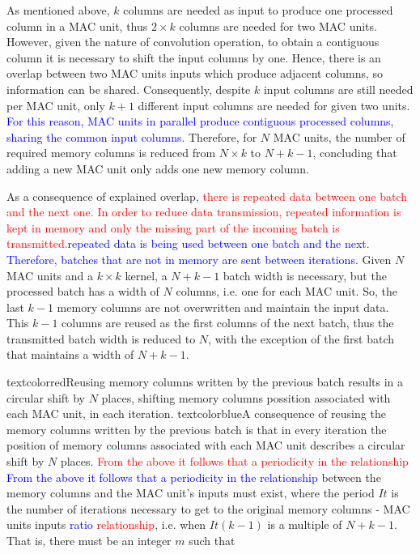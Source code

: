 \documentclass[conference,compsoc]{IEEEtran}
\begin{document}
As mentioned above, $k$ columns are needed as input to produce one processed
column in a MAC unit, thus $2 \times k$ columns are needed for two MAC units.
However, given the nature of convolution operation, to obtain a contiguous
column it is necessary to shift the input columns by one. Hence, there is an
overlap between two MAC units inputs which produce adjacent columns, so information can
be shared.
Consequently, despite $k$ input columns are still needed per MAC unit, only $k+1$
different input columns are needed for given two units. 
\textcolor{blue}{For this reason, MAC units in parallel produce contiguous processed
columns, sharing the common input columns}. 
Therefore, for $N$ MAC units, the number of required memory columns is reduced from $N \times k$ to $N+k-1$, concluding
that adding a new MAC unit only adds one new memory column.

As a consequence of explained overlap, \textcolor{red}{there is repeated data
between one batch and the next one. In order to reduce data transmission, repeated
information is kept in memory and only the missing part of 
the incoming batch is transmitted.}\textcolor{blue}{repeated data is being used
between one batch and the next. Therefore, batches that are not in memory are
sent between iterations.} Given $N$ MAC units and a $k\times k$ kernel, a $N+k-1$
batch width is necessary, but the processed batch has a width of $N$ columns, i.e.
one for each MAC unit. So, the last $k-1$ memory columns are not overwritten and
maintain the input data. This $k-1$ columns are reused as the first columns
of the next batch, thus the transmitted batch width is reduced to $N$, with the exception of
the first batch that maintains a width of $N+k-1$.


textcolor{red}{Reusing memory columns written by the previous batch results in
 a circular shift by $N$ places, shifting memory columns possition associated with each
MAC unit, in each iteration.}
textcolor{blue}{A consequence of reusing the memory columns written by the previous batch is
that in every iteration the position of memory columns associated with each
MAC unit describes a circular shift by $N$ places.} 
\textcolor{red}{From the above it
follows that a periodicity in the relationship} 
\textcolor{blue}{From the above it
follows that a periodicity in the relationship} between the memory columns and the
MAC unit's inputs must exist, where the period $It$ is the number of
iterations necessary to get to the original memory columns - MAC units
inputs \textcolor{blue}{ratio} \textcolor{red}{relationship}, i.e. when $It(k-1)$ is a multiple of $N+k-1$. That is, there
must be an integer $m$ such that 
\end{document}

